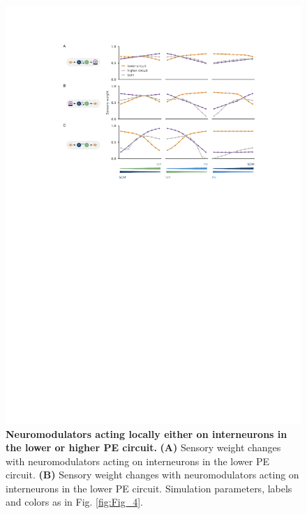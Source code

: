\documentclass[10pt,a4paper]{article}
\begin{document}
\begin{figure}[!h]
	\centering
    \includegraphics{../results/figures/final/Fig_4_S1}%
\caption{\footnotesize{\bf Neuromodulators acting locally either on interneurons in the lower or higher PE circuit. \newline}  
{\bf (A)} Sensory weight changes with neuromodulators acting on interneurons in the lower PE circuit.
{\bf (B)} Sensory weight changes with neuromodulators acting on interneurons in the lower PE circuit. Simulation parameters, labels and colors as in Fig. \ref{fig:Fig_4}. 
}
\label{fig:Fig_4_S1}
\end{figure}
\end{document}
